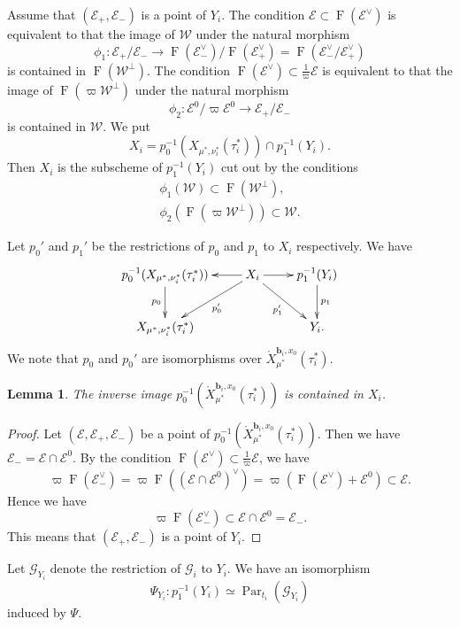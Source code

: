 \documentclass[12pt,a4paper]{article}
\newtheorem{lem}[thm]{Lemma}
\DeclareMathOperator{\Par}{Par}
\DeclareMathOperator{\oF}{F}
\newcommand{\bfb}{\mathbf{b}}
\newcommand{\cE}{\mathcal{E}}
\newcommand{\sG}{\mathscr{G}}
\newcommand{\sW}{\mathscr{W}}
\begin{document}
Assume that $(\cE_+, \cE_-)$ is a point of $Y_i$. 
The condition 
$\cE \subset \oF (\cE^{\vee})$ is equivalent to that 
the image of 
$\sW$ under the natural morphism 
\begin{equation}\label{eq:phi1def}
 \phi_1 \colon \cE_+/\cE_- \to \oF (\cE_-^{\vee})/\oF (\cE_+^{\vee})=\oF (\cE_-^{\vee}/\cE_+^{\vee}) 
\end{equation}
is contained in $\oF (\sW^{\perp})$. 
The condition 
$\oF (\cE^{\vee}) \subset \frac{1}{\varpi} \cE$ 
is equivalent to that 
the image of 
$\oF (\varpi \sW^{\perp})$ under the natural morphism 
\[
 \phi_2 \colon \cE^0 /\varpi \cE^0 \to \cE_+/\cE_- 
\]
is contained in $\sW$. 
We put 
\[
 X_i = p_0^{-1} (X_{\mu^*,\nu_i^*}(\tau_i^*)) \cap 
 p_1^{-1}(Y_i). 
\]
Then $X_i$ is the subscheme of 
$p_1^{-1}(Y_i)$ cut out by the conditions
\begin{align}
\phi_1 (\sW) \subset \oF (\sW^{\perp}), \label{eq:cdphi1} \\ 
\phi_2 (\oF (\varpi \sW^{\perp})) \subset \sW . \label{eq:cdphi2}
\end{align}

Let $p_0'$ and $p_1'$ be the restrictions of 
$p_0$ and $p_1$ to $X_i$ respectively. 
We have 
\[
 \xymatrix{
 p_0^{-1} (X_{\mu^*,\nu_i^*}(\tau_i^*))   \ar[d]_-{p_0} &  
 X_i \ar[l] \ar[r] \ar[dr]_-{p_1'} 
 \ar[ld]^-{p_0'}  & 
  p_1^{-1}(Y_i) \ar[d]^-{p_1} \\ 
 X_{\mu^*,\nu_i^*}(\tau_i^*) 
 & & Y_i  .
 }
\]
We note that $p_0$ and $p_0'$ are 
isomorphisms over 
$\mathring{X}_{\mu^*}^{\bfb_i,x_0}(\tau_i^*)$. 




\begin{lem}\label{lem:ImZi}
The inverse image 
$p_0^{-1}(\mathring{X}_{\mu^*}^{\bfb_i,x_0}(\tau_i^*))$ is contained in $X_i$. 
\end{lem}
\begin{proof}
Let $(\cE,\cE_+,\cE_-)$ be a point of 
$p_0^{-1}(\mathring{X}_{\mu^*}^{\bfb_i,x_0}(\tau_i^*))$. 
Then we have $\cE_-=\cE \cap \cE^0$. 
By the condition 
$\oF (\cE^{\vee}) \subset \frac{1}{\varpi} \cE$, 
we have 
\[
 \varpi \oF (\cE_-^{\vee})= \varpi \oF ((\cE \cap \cE^0)^{\vee}) =\varpi (\oF (\cE^{\vee}) + \cE^0) \subset \cE . 
\]
Hence we have 
\[
 \varpi \oF (\cE_-^{\vee}) \subset \cE \cap \cE^0 =\cE_-. 
\]
This means that $(\cE_+,\cE_-)$ is a point of $Y_i$. 
\end{proof}

Let $\sG_{Y_i}$ denote the restriction of $\sG_i$ to $Y_i$. 
We have an isomorphism 
\begin{equation}\label{eq:isoGr}
 \Psi_{Y_i} \colon p_1^{-1}(Y_i) \simeq \Par_{t_i}(\sG_{Y_i})
\end{equation}
induced by $\Psi$. 
\end{document}
